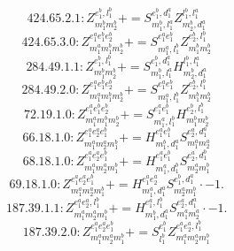 \documentclass[letterpaper,10pt,fleqn,leqno,onecolumn]{article}
\begin{document}
\begin{equation} \;\;\;\;\;\;  424.65.2.1: Z^{e_{1}^{b},l_{1}^{b}}_{m_{1}^{b}m_{2}^{b}}+=S^{e_{1}^{b},d_{1}^{a}}_{m_{1}^{b},l_{1}^{a}}Z^{l_{1}^{b},l_{1}^{a}}_{m_{2}^{b},d_{1}^{a}} \end{equation}
\begin{equation} \;\;\;\;\;\;  424.65.3.0: Z^{e_{1}^{a}e_{1}^{b}e_{2}^{b}}_{m_{1}^{a}m_{1}^{b}m_{2}^{b}}+=S^{e_{1}^{a}e_{1}^{b}}_{m_{1}^{a},l_{1}^{b}}Z^{e_{2}^{b},l_{1}^{b}}_{m_{1}^{b}m_{2}^{b}} \end{equation}
\begin{equation} \;\;\;\;\;\;  284.49.1.1: Z^{e_{1}^{b},l_{1}^{b}}_{m_{1}^{b}m_{2}^{b}}+=S^{e_{1}^{b},d_{1}^{a}}_{m_{1}^{b},l_{1}^{a}}H^{l_{1}^{b},l_{1}^{a}}_{m_{2}^{b},d_{1}^{a}} \end{equation}
\begin{equation} \;\;\;\;\;\;  284.49.2.0: Z^{e_{1}^{a}e_{1}^{b}e_{2}^{b}}_{m_{1}^{a}m_{1}^{b}m_{2}^{b}}+=S^{e_{1}^{a}e_{1}^{b}}_{m_{1}^{a},l_{1}^{b}}Z^{e_{2}^{b},l_{1}^{b}}_{m_{1}^{b}m_{2}^{b}} \end{equation}
\begin{equation} \;\;\;\;\;\;  72.19.1.0: Z^{e_{1}^{a}e_{1}^{b}e_{2}^{b}}_{m_{1}^{a}m_{1}^{b}m_{2}^{b}}+=S^{e_{1}^{a}e_{1}^{b}}_{m_{1}^{a},l_{1}^{b}}H^{e_{2}^{b},l_{1}^{b}}_{m_{1}^{b}m_{2}^{b}} \end{equation}
\begin{equation} \;\;\;\;\;\;  66.18.1.0: Z^{e_{1}^{a}e_{2}^{a}e_{1}^{b}}_{m_{1}^{a}m_{2}^{a}m_{1}^{b}}+=H^{e_{1}^{a}e_{1}^{b}}_{m_{1}^{b},d_{1}^{a}}S^{e_{2}^{a},d_{1}^{a}}_{m_{1}^{a}m_{2}^{a}} \end{equation}
\begin{equation} \;\;\;\;\;\;  68.18.1.0: Z^{e_{1}^{a}e_{2}^{a}e_{1}^{b}}_{m_{1}^{a}m_{2}^{a}m_{1}^{b}}+=H^{e_{1}^{a}e_{1}^{b}}_{m_{1}^{a},d_{1}^{b}}S^{e_{2}^{a},d_{1}^{b}}_{m_{2}^{a}m_{1}^{b}} \end{equation}
\begin{equation} \;\;\;\;\;\;  69.18.1.0: Z^{e_{1}^{a}e_{2}^{a}e_{1}^{b}}_{m_{1}^{a}m_{2}^{a}m_{1}^{b}}+=H^{e_{1}^{a}e_{2}^{a}}_{m_{1}^{a},d_{1}^{a}}S^{e_{1}^{b},d_{1}^{a}}_{m_{2}^{a}m_{1}^{b}}\cdot -1. \end{equation}
\begin{equation} \;\;\;\;\;\;  187.39.1.1: Z^{e_{1}^{a}e_{2}^{a},l_{1}^{b}}_{m_{1}^{a}m_{2}^{a}m_{1}^{b}}+=H^{e_{1}^{a},l_{1}^{b}}_{m_{1}^{b},d_{1}^{a}}S^{e_{2}^{a},d_{1}^{a}}_{m_{1}^{a}m_{2}^{a}}\cdot -1. \end{equation}
\begin{equation} \;\;\;\;\;\;  187.39.2.0: Z^{e_{1}^{a}e_{2}^{a}e_{1}^{b}}_{m_{1}^{a}m_{2}^{a}m_{1}^{b}}+=S^{e_{1}^{b}}_{l_{1}^{b}}Z^{e_{1}^{a}e_{2}^{a},l_{1}^{b}}_{m_{1}^{a}m_{2}^{a}m_{1}^{b}} \end{equation}
\end{document}
